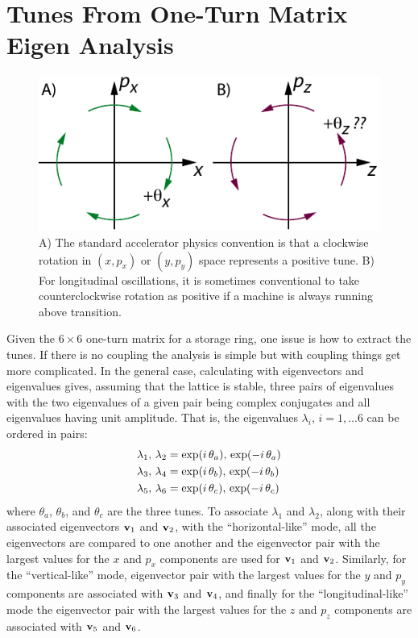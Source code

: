 \section{Tunes From One-Turn Matrix Eigen Analysis}
\label{s:eigen.tune}

\begin{figure}[tb]
  \centering
  \includegraphics[width=5in]{tune.pdf}
  \caption[Illustration of a positive tune]{A) The standard accelerator physics convention is that 
a clockwise rotation in $(x, p_x)$ or $(y, p_y)$ space represents a positive tune. B) For longitudinal
oscillations, it is sometimes conventional to take counterclockwise rotation as positive if a machine
is always running above transition.}
  \label{f:tune}
\end{figure}

Given the $6 \times 6$ one-turn matrix for a storage ring, one issue is how to extract the tunes. If
there is no coupling the analysis is simple but with coupling things get more complicated. In the
general case, calculating with eigenvectors and eigenvalues gives, assuming that the lattice is
stable, three pairs of eigenvalues with the two eigenvalues of a given pair being complex
conjugates and all eigenvalues having unit amplitude. That is, the eigenvalues $\lambda_i$, $i =
1, \ldots 6$ can be ordered in pairs:
\begin{align}
  \lambda_1, \, \lambda_2 &= \exp(i \, \theta_a), \, \exp(-i \, \theta_a) \nonumber \\
  \lambda_3, \, \lambda_4 &= \exp(i \, \theta_b), \, \exp(-i \, \theta_b) \label{lleit} \\
  \lambda_5, \, \lambda_6 &= \exp(i \, \theta_c), \, \exp(-i \, \theta_c) \nonumber
\end{align}
where $\theta_a$, $\theta_b$, and $\theta_c$ are the three tunes. To associate $\lambda_1$ and
$\lambda_2$, along with their associated eigenvectors ${\bf v}_1$ and ${\bf v}_2$, with the
``horizontal-like'' mode, all the eigenvectors are compared to one another and the eigenvector pair
with the largest values for the $x$ and $p_x$ components are used for ${\bf v}_1$ and ${\bf v}_2$.
Similarly, for the ``vertical-like'' mode, eigenvector pair with the largest values for the $y$ and
$p_y$ components are associated with ${\bf v}_3$ and ${\bf v}_4$, and finally for the ``longitudinal-like''
mode the eigenvector pair with the largest values for the $z$ and $p_z$ components are associated
with ${\bf v}_5$ and ${\bf v}_6$.

